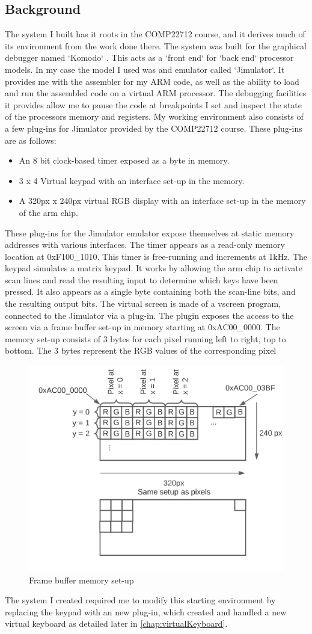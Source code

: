 \subsection{Background}
The system I built has it roots in the COMP22712 course, and it derives much of its environment from the work done there. The system was built for the graphical debugger named `Komodo` \cite{kmd}. This acts as a `front end` for `back end` processor models. In my case the model I used was  and emulator called `Jimulator`. It provides me with the assembler for my ARM code, as well as the ability to load and run the assembled code on a virtual ARM processor. The debugging facilities it provides allow me to pause the code at breakpoints I set and inspect the state of the processors memory and registers. My working environment also consists of a few plug-ins for Jimulator provided by the COMP22712 course. These plug-ins are as follows:

\begin{itemize}
	\item An 8 bit clock-based timer exposed as a byte in memory.
	\item 3 x 4 Virtual keypad with an interface set-up in the memory.
	\item A 320px x 240px virtual RGB display with an interface set-up in the memory of the arm chip.
\end{itemize}

These plug-ins for the Jimulator emulator expose themselves at static memory addresses with various interfaces.
The timer appears as a read-only memory location at 0xF100\_1010. This timer is free-running and increments at 1kHz. 
The keypad simulates a matrix keypad. It works by allowing the arm chip to activate scan lines and read the resulting input to determine which keys have been pressed. It also appears as a single byte containing both the scan-line bits, and the resulting output bits.
The virtual screen is made of a vscreen program, connected to the Jimulator via a plug-in. The plugin exposes the access to the screen via a frame buffer set-up in memory starting at 0xAC00\_0000. The memory set-up consists of 3 bytes for each pixel running left to right, top to bottom. The 3 bytes represent the RGB values of the corresponding pixel

\begin{figure}[ht!]
	\includegraphics[width=0.5\linewidth]{figures/LCD.png}\centering
	\caption{Frame buffer memory set-up}
	\label{fig:LCDMem}
\end{figure}

The system I created required me to modify this starting environment by replacing the keypad with an new plug-in, which created and handled a new virtual keyboard as detailed later in \autoref{chap:virtualKeyboard}. 
